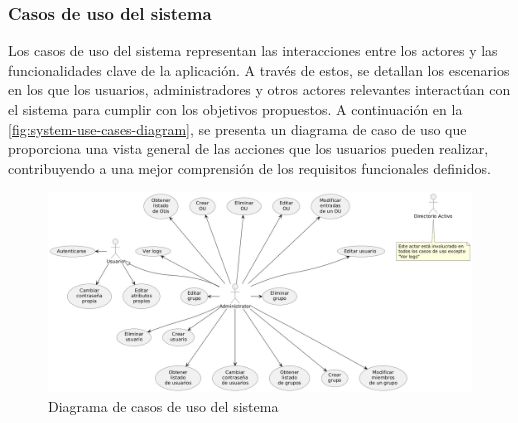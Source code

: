 \subsubsection{Casos de uso del sistema}

Los casos de uso del sistema representan las interacciones entre los actores y las funcionalidades clave de la aplicación. A través de estos, se detallan los escenarios en los que los usuarios, administradores y otros actores relevantes interactúan con el sistema para cumplir con los objetivos propuestos. A continuación en la \autoref{fig:system-use-cases-diagram}, se presenta un diagrama de caso de uso que proporciona una vista general de las acciones que los usuarios pueden realizar, contribuyendo a una mejor comprensión de los requisitos funcionales definidos.

\begin{figure}[H]
    \centering
    \includegraphics[width=\linewidth]{images/puml/system-diagram/system-diagram.png}
    \caption{Diagrama de casos de uso del sistema}
    \label{fig:system-use-cases-diagram}
\end{figure}